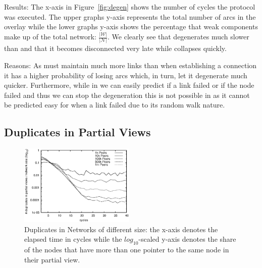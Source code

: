 \begin{asparadesc}
\item[Results:]
    The x-axis in Figure~\ref{fig:degen} shows the number of cycles the protocol was
    executed.
    The upper graphs y-axis represents the total number of arcs in the
    overlay while the lower graphs y-axis shows the percentage that weak components
    make up of the total network: $\frac{|\mathcal{W}|}{|\mathcal{N}|}$.
    We clearly see that \SPRAY{} degenerates much slower than \SCAMP{} and that
    it becomes disconnected very late while \SCAMP{} collapses quickly.

\item[Reasons:]
    As \SCAMP{} must maintain much more links than \SPRAY{} when establishing a
    connection it has a higher probability of losing arcs which, in turn, let it
    degenerate much quicker.
    Furthermore, while in \SPRAY{} we can easily predict if a link failed or if
    the node failed and thus we can stop the degeneration this is not possible in
    \SCAMP{} as it cannot be predicted easy for when a link failed due to its
    random walk nature.

\end{asparadesc}

\subsection{Duplicates in Partial Views}

\begin{figure}
  \centering \includegraphics[width=0.49\textwidth]{img/dupl.eps}
  \caption{\label{fig:dupl}
  Duplicates in Networks of different size: the x-axis denotes the elapsed time
  in cycles while the $log_{10}$-scaled y-axis denotes the share of the nodes that
  have more than one pointer to the same node in their partial view.
  } \end{figure}

